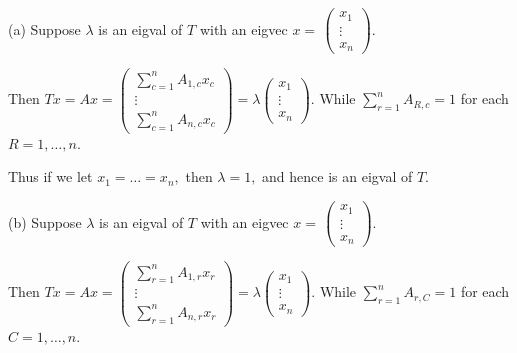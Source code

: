 \documentclass[a4paper, 11pt, UTF8]{article}
\begin{document}
\begin{large}
\par\quad
(a) Suppose $\lambda$ is an eigval of $T$ with an eigvec $x=\,${\small$\begin{pmatrix}
x_1\\ \vdots\\ x_n
\end{pmatrix}.$}\par\quad\Ha
Then {\small$Tx=Ax=\begin{pmatrix} \sum\limits_{c=1}^n A_{1,c}x_c\\ \vdots\\ \sum\limits_{c=1}^n A_{n,c}x_c\end{pmatrix}=\lambda \begin{pmatrix} x_1\\ \vdots\\ x_n\end{pmatrix}.$} While $\sum\limits_{r=1}^n A_{R,c}=1$ for each $R=1,\dots,n.$\par\vspace{6pt}\quad\Ha
Thus if we let $x_1=\dots=x_n,$ then $\lambda=1,$ and hence is an eigval of $T.$\par\vspace{18pt}\quad
(b) Suppose $\lambda$ is an eigval of $T$ with an eigvec $x=\,${\small$\begin{pmatrix}
x_1\\ \vdots\\ x_n
\end{pmatrix}.$}\par\quad\Hb
Then {\small$Tx=Ax=\begin{pmatrix} \sum\limits_{r=1}^n A_{1,r}x_r\\ \vdots\\ \sum\limits_{r=1}^n A_{n,r}x_r\end{pmatrix}=\lambda \begin{pmatrix} x_1\\ \vdots\\ x_n\end{pmatrix}.$} While $\sum\limits_{r=1}^n A_{r,C}=1$ for each $C=1,\dots,n.$\par\quad\Hb

\end{large}
\end{document}

